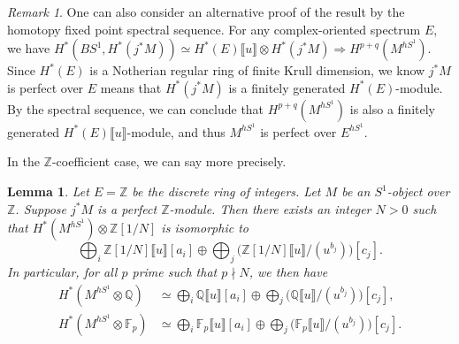 \documentclass[11pt]{amsart}
\numberwithin{equation}{section}
\theoremstyle{plain}
\newtheorem{Lemma}[lemma]{Lemma}
\theoremstyle{definition}
\theoremstyle{remark}
\newtheorem{RMK}[rmk]{Remark}
\newcommand{\bF} { {\mathbb{F}}}
\newcommand{\bQ} { {\mathbb{Q}}}
\newcommand{\bZ} { {\mathbb{Z}}}
\newcommand{\fpw}[1]{{\llbracket #1\rrbracket}}
\begin{document}
\begin{RMK}
One can also consider an alternative proof of the result by the homotopy fixed point spectral sequence. For any complex-oriented spectrum $E$, we have $H^*(BS^1, H^*(j^*M))\simeq H^*(E)\fpw{u}\otimes H^*(j^*M) \Rightarrow H^{p+q}(M^{hS^1})$. Since $H^*(E)$ is a Notherian regular ring of finite Krull dimension, we know $j^*M$ is perfect over $E$ means that $H^*(j^*M)$ is a finitely generated $H^*(E)$-module. By the spectral sequence, we can conclude that $H^{p+q}(M^{hS^1})$ is also a finitely generated $H^*(E)\fpw{u}$-module, and thus $M^{hS^1}$ is perfect over $E^{hS^1}$.
\end{RMK}


In the $\bZ$-coefficient case, we can say more precisely.
\begin{Lemma}\label{lem: perfectness over Z}Let $E=\bZ$ be the discrete ring of integers. Let $M$ be an $S^1$-object over $\bZ$. Suppose $j^*M$ is a perfect $\bZ$-module.
Then there exists an integer $N > 0$ such that $H^*(M^{hS^1}) \otimes \bZ[1/N]$ is isomorphic to\[
 \bigoplus_i\bZ[1/N]\fpw{u}[a_i]
       \oplus\bigoplus_j\bigl(\bZ[1/N]\fpw{u}/(u^{b_j})\bigr)[c_j].
\]
In particular, for all $p$ prime such that $p\nmid N$, we then have
\begin{equation*}
    \begin{split}
        H^*(M^{hS^1}\otimes\bQ) &\simeq  \bigoplus_i\bQ\fpw{u}[a_i]
       \oplus\bigoplus_j\bigl(\bQ\fpw{u}/(u^{b_j})\bigr)[c_j]   ,\\
        H^*(M^{hS^1}\otimes\bF_p) &\simeq   \bigoplus_i\bF_p\fpw{u}[a_i]
       \oplus\bigoplus_j\bigl(\bF_p\fpw{u}/(u^{b_j})\bigr)[c_j]  .
    \end{split}
\end{equation*}
\end{Lemma}
\end{document}
